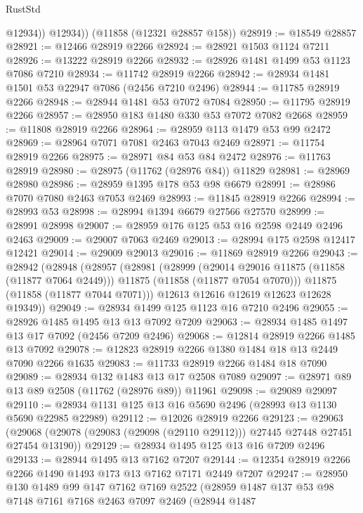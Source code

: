 \begin{lexlean}{RustStd}
\begin{coremodule}
            @12934))
        @12934))
    (@11858 (@12321 @28857 @158))
@28919 := @18549 @28857
@28921 := @12466 @28919 @2266
@28924 := @28921 @1503 @1124 @7211
@28926 := @13222 @28919 @2266
@28932 := @28926 @1481 @1499 @53 @1123 @7086 @7210
@28934 := @11742 @28919 @2266
@28942 := @28934 @1481 @1501 @53 @22947 @7086 (@2456 @7210 @2496)
@28944 := @11785 @28919 @2266
@28948 := @28944 @1481 @53 @7072 @7084
@28950 := @11795 @28919 @2266
@28957 := @28950 @183 @1480 @330 @53 @7072 @7082 @2668
@28959 := @11808 @28919 @2266
@28964 := @28959 @113 @1479 @53 @99 @2472
@28969 := @28964 @7071 @7081 @2463 @7043 @2469
@28971 := @11754 @28919 @2266
@28975 := @28971 @84 @53 @84 @2472
@28976 := @11763 @28919
@28980 := @28975 (@11762 (@28976 @84)) @11829
@28981 := @28969 @28980
@28986 := @28959 @1395 @178 @53 @98 @6679
@28991 := @28986 @7070 @7080 @2463 @7053 @2469
@28993 := @11845 @28919 @2266
@28994 := @28993 @53
@28998 := @28994 @1394 @6679 @27566 @27570
@28999 := @28991 @28998
@29007 := @28959 @176 @125 @53 @16 @2598 @2449 @2496 @2463
@29009 := @29007 @7063 @2469
@29013 := @28994 @175 @2598 @12417 @12421
@29014 := @29009 @29013
@29016 := @11869 @28919 @2266
@29043 := @28942
    (@28948
      (@28957
        (@28981
          (@28999
            (@29014 @29016 @11875 (@11858 (@11877 @7064 @2449)))
            @11875
            (@11858 (@11877 @7054 @7070)))
          @11875
          (@11858 (@11877 @7044 @7071)))
        @12613
        @12616
        @12619
        @12623
        @12628
        @19349))
@29049 := @28934 @1499 @125 @1123 @16 @7210 @2496
@29055 := @28926 @1485 @1495 @13 @13 @7092 @7209
@29063 := @28934 @1485 @1497 @13 @17 @7092 (@2456 @7209 @2496)
@29068 := @12814 @28919 @2266 @1485 @13 @7092
@29078 := @12823 @28919 @2266 @1380 @1484 @18 @13 @2449 @7090 @2266 @1635
@29083 := @11733 @28919 @2266 @1484 @18 @7090
@29089 := @28934 @132 @1483 @13 @17 @2508 @7089
@29097 := @28971 @89 @13 @89 @2508 (@11762 (@28976 @89)) @11961
@29098 := @29089 @29097
@29110 := @28934 @1131 @125 @13 @16 @5690 @2496 (@28993 @13 @1130 @5690 @22985 @22989)
@29112 := @12026 @28919 @2266
@29123 := @29063
    (@29068 (@29078 (@29083 (@29098 (@29110 @29112))) @27445 @27448 @27451 @27454 @13190))
@29129 := @28934 @1495 @125 @13 @16 @7209 @2496
@29133 := @28944 @1495 @13 @7162 @7207
@29144 := @12354 @28919 @2266 @2266 @1490 @1493 @173 @13 @7162 @7171 @2449 @7207
@29247 := @28950
    @130
    @1489
    @99
    @147
    @7162
    @7169
    @2522
    (@28959
      @1487
      @137
      @53
      @98
      @7148
      @7161
      @7168
      @2463
      @7097
      @2469
      (@28944
        @1487

\end{coremodule}
\end{lexlean}
